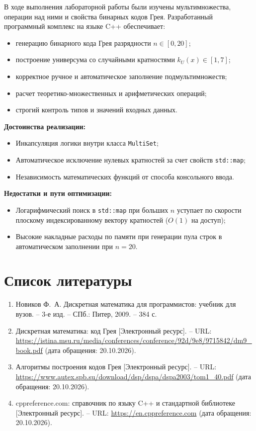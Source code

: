 \documentclass[14pt]{extreport}
\begin{document}
В ходе выполнения лабораторной работы были изучены мультимножества, операции над ними и свойства бинарных кодов Грея. Разработанный программный комплекс на языке C++ обеспечивает:
\begin{itemize}
    \item генерацию бинарного кода Грея разрядности $n \in [0, 20]$;
    \item построение универсума со случайными кратностями $k_U(x) \in [1, 7]$;
    \item корректное ручное и автоматическое заполнение подмультимножеств;
    \item расчет теоретико-множественных и арифметических операций;
    \item строгий контроль типов и значений входных данных.
\end{itemize}

\textbf{Достоинства реализации:}
\begin{itemize}
    \item Инкапсуляция логики внутри класса \texttt{MultiSet};
    \item Автоматическое исключение нулевых кратностей за счет свойств \texttt{std::map};
    \item Независимость математических функций от способа консольного ввода.
\end{itemize}

\textbf{Недостатки и пути оптимизации:}
\begin{itemize}
    \item Логарифмический поиск в \texttt{std::map} при больших $n$ уступает по скорости плоскому индексированному вектору кратностей ($O(1)$ на доступ);
    \item Высокие накладные расходы по памяти при генерации пула строк в автоматическом заполнении при $n=20$.
\end{itemize}

\newpage
{\centering\section*{Список литературы}}

\begin{enumerate}
    \item Новиков Ф.~А. Дискретная математика для программистов: учебник для вузов. -- 3-е изд. -- СПб.: Питер, 2009. -- 384 с.
    \item Дискретная математика: код Грея [Электронный ресурс]. -- URL: \url{https://istina.msu.ru/media/conferences/conference/92d/9e8/9715842/dm9_book.pdf} (дата обращения: 20.10.2026).
    \item Алгоритмы построения кодов Грея [Электронный ресурс]. -- URL: \url{https://www.autex.spb.su/download/dsp/dspa/dspa2003/tom1_40.pdf} (дата обращения: 20.10.2026).
    \item cppreference.com: справочник по языку C++ и стандартной библиотеке [Электронный ресурс]. -- URL: \url{https://en.cppreference.com} (дата обращения: 20.10.2026).
\end{enumerate}
\end{document}
